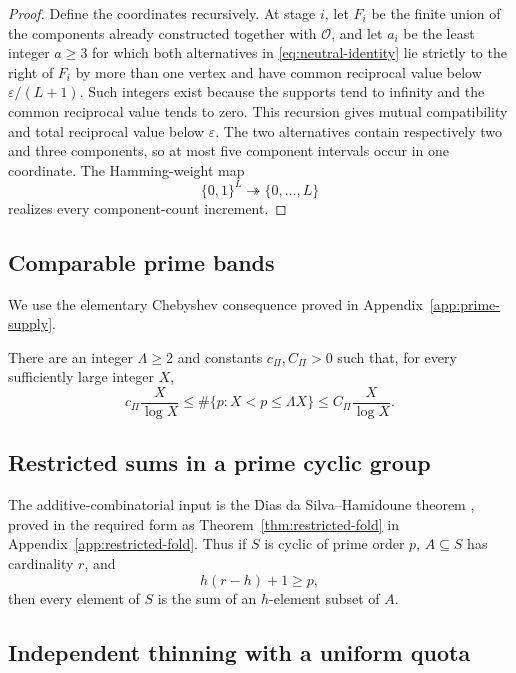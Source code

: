 \begin{proof}
Define the coordinates recursively.  At stage $i$, let $F_i$ be the finite union of the components already constructed together with $\mathcal O$, and let $a_i$ be the least integer $a\ge3$ for which both alternatives in \eqref{eq:neutral-identity} lie strictly to the right of $F_i$ by more than one vertex and have common reciprocal value below $\varepsilon/(L+1)$.  Such integers exist because the supports tend to infinity and the common reciprocal value tends to zero.  This recursion gives mutual compatibility and total reciprocal value below $\varepsilon$.  The two alternatives contain respectively two and three components, so at most five component intervals occur in one coordinate.  The Hamming-weight map
\[
\{0,1\}^L\twoheadrightarrow\{0,\ldots,L\}
\]
realizes every component-count increment.
\end{proof}


\subsection{Comparable prime bands}

We use the elementary Chebyshev consequence proved in Appendix~\ref{app:prime-supply}.

\begin{proposition}\label{prop:prime-supply-main}
There are an integer $\Lambda\ge2$ and constants $c_\Pi,C_\Pi>0$ such that, for every sufficiently large integer $X$,
\[
c_\Pi\frac X{\log X}
\le
\#\{p:X<p\le\Lambda X\}
\le
C_\Pi\frac X{\log X}.
\]
\end{proposition}

\subsection{Restricted sums in a prime cyclic group}

The additive-combinatorial input is the Dias da Silva--Hamidoune theorem \cite{DiasDaSilvaHamidoune1994}, proved in the required form as Theorem~\ref{thm:restricted-fold} in Appendix~\ref{app:restricted-fold}.  Thus if $S$ is cyclic of prime order $p$, $A\subseteq S$ has cardinality $r$, and
\[
h(r-h)+1\ge p,
\]
then every element of $S$ is the sum of an $h$-element subset of $A$.

\subsection{Independent thinning with a uniform quota}

